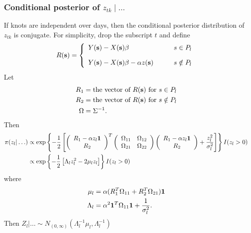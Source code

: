 \subsubsection*{Conditional posterior of $z_{tk} \mid \ldots $}\label{s:mvcondu}
If knots are independent over days, then the conditional posterior distribution of $z_{tk}$ is conjugate.
For simplicity, drop the subscript $t$ and define
\begin{align*}
R(\mbox{\bf s}) = \left\{
    \begin{array}{ll}
        Y(\mbox{\bf s}) - X(\mbox{\bf s}) \beta &s \in P_l\\[1em]
        Y(\mbox{\bf s}) - X(\mbox{\bf s}) \beta - \alpha z(\mbox{\bf s}) \qquad & s \notin P_l
    \end{array}
\right.
\end{align*}
Let
\begin{align*}
    R_1 &= \text{the vector of } R(\mbox{\bf s}) \text{ for } s \in P_l \\
    R_2 &= \text{the vector of } R(\mbox{\bf s}) \text{ for } s \notin P_l \\
    \Omega &= \Sigma^{-1}.
\end{align*}
Then
\begin{align*}
    \pi(z_l | \ldots) &\propto \exp \left\{ -\frac{ 1 }{ 2 } \left[
        \left( \begin{array}{c}
            R_1 - \alpha z_l \mbox{\boldmath $1$}\\
            R_2
        \end{array} \right)^T
        \left( \begin{array}{cc}
            \Omega_{11} & \Omega_{12}\\
            \Omega_{21} & \Omega_{22}
        \end{array} \right)
        \left( \begin{array}{c}
            R_1 - \alpha z_l \mbox{\boldmath $1$}\\
            R_2
        \end{array} \right)
        +  \frac{ z_l^2 }{ \sigma_l^2 }\right]
    \right\} I(z_l > 0) \\
        &\propto \exp \left\{ -\frac{ 1 }{ 2 } \left[ \Lambda_l z_l^2 - 2 \mu_l z_l \right] \right\} I(z_l > 0)
\end{align*}
where
\begin{align*}
    \mu_l &= \alpha ( R_1^T \Omega_{11} + R_2^T \Omega_{21} )\mbox{\boldmath $1$}\\
    \Lambda_l &= \alpha^2 \mbox{\boldmath $1$}^T \Omega_{11} \mbox{\boldmath $1$} + \frac{ 1 }{ \sigma^2_l }.
\end{align*}
Then $Z_l | \ldots \sim N_{(0, \infty)} (\Lambda_l^{-1} \mu_l, \Lambda_l^{-1})$